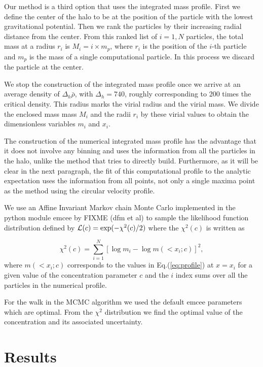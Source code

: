 \documentclass{emulateapj}
\begin{document}
Our method is a third option that uses the integrated mass profile.
First we define the center of the halo to be at the position of the
particle with the lowest gravitational potential.
Then we rank the particles by their increasing radial distance from
the center.
From this ranked list of $i=1,N$ particles, the total mass at a radius
$r_i$ is $M_i=i\times m_p$, where $r_i$ is
the position of the $i$-th particle and $m_p$ is the mass of a single
computational particle.
In this process we discard the particle at the center.

We stop the construction of the integrated mass profile once we arrive
at an average density of $\Delta_h\bar{\rho}$, with $\Delta_h=740$,
roughly corresponding to 200 times the critical density.
This radius marks the virial radius and the virial mass.
We divide the enclosed mass mass $M_i$ and the radii $r_i$ by these
virial values to obtain the dimensionless variables $m_i$ and $x_i$.

The construction of the numerical integrated mass profile has the
advantage that it does not involve any binning and uses the
information from all the particles in the halo, unlike the method that
tries to directly build.
Furthermore, as it will be clear in the next paragraph, the fit of
this computational profile to the analytic expectation uses the
information from all points, not only a single maxima point as the
method using the circular velocity profile.

We use an Affine Invariant Markov chain Monte Carlo implemented in the python
module emcee by FIXME (dfm et al) to sample the likelihood
function distribution defined by ${\cal L}(c)=\exp(-\chi^2(c)/2)$
where the $\chi^2(c)$ is written as

\begin{equation}
\chi^2(c)= \sum_{i=1}^{N}[\log m_i - \log m(< x_i;c)]^2,
\end{equation}
%
where $m(<x_i;c)$ corresponds to the values in Eq.(\ref{eq:profile}) at
$x=x_i$ for a given value of the concentration parameter $c$ and the
$i$ index sums over all the particles in the numerical profile.

For the walk in the MCMC algorithm we used the default emcee parameters which
are optimal. From the $\chi^2$ distribution we find the optimal value of the
concentration and  its associated uncertainty.

\section{Results}
\label{sec:results}
\end{document}
